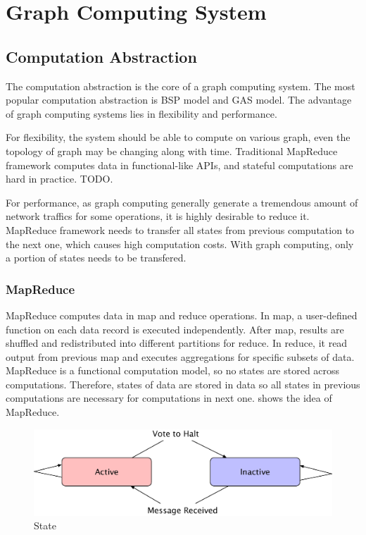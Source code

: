 \section{Graph Computing System}
\subsection{Computation Abstraction}
The computation abstraction is the core of a graph computing system. The
most popular computation abstraction is BSP model and GAS model.
The advantage of graph computing systems lies in flexibility and performance.

For flexibility, the system should be able to compute on various
graph, even the topology of graph may be changing along with time.
Traditional MapReduce framework computes data in functional-like
APIs, and stateful computations are hard in practice. TODO.

For performance, as graph computing generally generate a tremendous
amount of network traffics for some operations,
it is highly desirable to reduce it. MapReduce framework needs to transfer
all states from previous computation to the next one, which causes high computation
costs. With graph computing, only a portion of states needs to be transfered.

\subsubsection{MapReduce}
MapReduce computes data in map and reduce operations.
In map, a user-defined function on each data record is executed independently.
After map, results are shuffled and redistributed into different partitions
for reduce. In reduce, it read output from previous map and executes
aggregations for specific subsets of data. MapReduce is a functional
computation model, so no states are stored across computations.
Therefore, states of data are stored in data so all states
in previous computations are necessary
for computations in next one.  shows the idea of MapReduce.

\begin{figure}
  \center
  \includegraphics[width=.8\linewidth]{figures/state}
  \caption{State}
  \label{state}
\end{figure}

